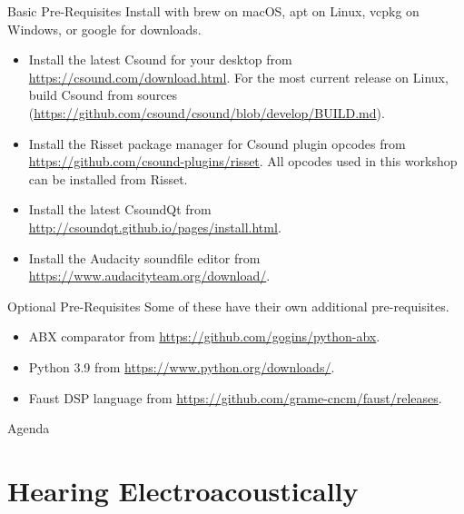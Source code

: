 \documentclass{beamer}
\begin{document}
    \begin{frame}{Basic Pre-Requisites}
    	Install with brew on macOS, apt on Linux, vcpkg on Windows, or 
	google for downloads.
        \begin{itemize}
            \item Install the latest Csound for your desktop from
            \url{https://csound.com/download.html}. For the most current release on
            Linux, build Csound from sources
            (\url{https://github.com/csound/csound/blob/develop/BUILD.md}).
            \item Install the Risset package manager for Csound plugin opcodes from 
            \url{https://github.com/csound-plugins/risset}. All opcodes used in this 
            workshop can be installed from Risset.
            \item Install the latest CsoundQt from
            \url{http://csoundqt.github.io/pages/install.html}.
            \item Install the Audacity soundfile editor from
            \url{https://www.audacityteam.org/download/}.
        \end{itemize}
    \end{frame}
    
    \begin{frame}{Optional Pre-Requisites}
        Some of these have their own additional pre-requisites.
        \begin{itemize}
            \item ABX comparator from \url{https://github.com/gogins/python-abx}.
            \item Python 3.9 from \url{https://www.python.org/downloads/}.
            \item Faust DSP language from
            \url{https://github.com/grame-cncm/faust/releases}.
        \end{itemize}
    \end{frame}
    
    \begin{frame}{Agenda}
        \tableofcontents
    \end{frame}
    
    \section{Hearing Electroacoustically}
    
\end{document}
